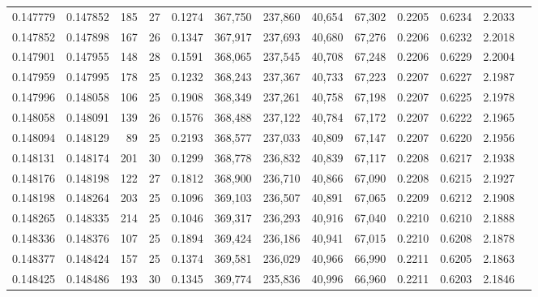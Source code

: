 \begin{tabular}{rrrrrrrrrrrrr}
0.147779 & 0.147852 & 185 &  27 &                                     0.1274 & 367,750 & 237,860 &  40,654 &  67,302 & 0.2205 & 0.6234 & 2.2033 \\
0.147852 & 0.147898 & 167 &  26 &                                     0.1347 & 367,917 & 237,693 &  40,680 &  67,276 & 0.2206 & 0.6232 & 2.2018 \\
0.147901 & 0.147955 & 148 &  28 &                                     0.1591 & 368,065 & 237,545 &  40,708 &  67,248 & 0.2206 & 0.6229 & 2.2004 \\
0.147959 & 0.147995 & 178 &  25 &                                     0.1232 & 368,243 & 237,367 &  40,733 &  67,223 & 0.2207 & 0.6227 & 2.1987 \\
0.147996 & 0.148058 & 106 &  25 &                                     0.1908 & 368,349 & 237,261 &  40,758 &  67,198 & 0.2207 & 0.6225 & 2.1978 \\
0.148058 & 0.148091 & 139 &  26 &                                     0.1576 & 368,488 & 237,122 &  40,784 &  67,172 & 0.2207 & 0.6222 & 2.1965 \\
0.148094 & 0.148129 &  89 &  25 &                                     0.2193 & 368,577 & 237,033 &  40,809 &  67,147 & 0.2207 & 0.6220 & 2.1956 \\
0.148131 & 0.148174 & 201 &  30 &                                     0.1299 & 368,778 & 236,832 &  40,839 &  67,117 & 0.2208 & 0.6217 & 2.1938 \\
0.148176 & 0.148198 & 122 &  27 &                                     0.1812 & 368,900 & 236,710 &  40,866 &  67,090 & 0.2208 & 0.6215 & 2.1927 \\
0.148198 & 0.148264 & 203 &  25 &                                     0.1096 & 369,103 & 236,507 &  40,891 &  67,065 & 0.2209 & 0.6212 & 2.1908 \\
0.148265 & 0.148335 & 214 &  25 &                                     0.1046 & 369,317 & 236,293 &  40,916 &  67,040 & 0.2210 & 0.6210 & 2.1888 \\
0.148336 & 0.148376 & 107 &  25 &                                     0.1894 & 369,424 & 236,186 &  40,941 &  67,015 & 0.2210 & 0.6208 & 2.1878 \\
0.148377 & 0.148424 & 157 &  25 &                                     0.1374 & 369,581 & 236,029 &  40,966 &  66,990 & 0.2211 & 0.6205 & 2.1863 \\
0.148425 & 0.148486 & 193 &  30 &                                     0.1345 & 369,774 & 235,836 &  40,996 &  66,960 & 0.2211 & 0.6203 & 2.1846 \\

\end{tabular}
